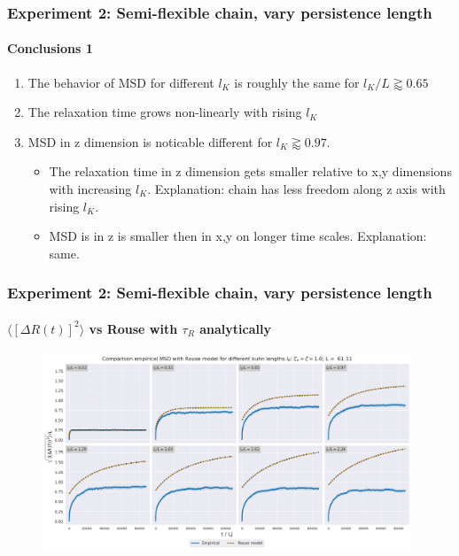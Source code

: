 \documentclass[handout]{beamer}
\newcommand{\mean}[1]{\langle #1 \rangle}
\begin{document}
\begin{frame}
    \frametitle{Experiment 2: Semi-flexible chain, vary persistence length}
    \framesubtitle{Conclusions 1}

    \begin{enumerate}
        \item The behavior of MSD for different $l_K$ is roughly the same for $l_K/L \gtrapprox 0.65$
        \item The relaxation time grows non-linearly with rising $l_K$
        \item MSD in z dimension is noticable different for $l_K \gtrapprox 0.97$. 
        \begin{itemize}
            \item The relaxation time in z dimension gets smaller 
            relative to x,y dimensions with increasing $l_K$. Explanation: chain has less freedom along z axis with rising $l_K$. 
            \item MSD is in z is smaller then in x,y on longer time scales. Explanation: same.
        \end{itemize}
    \end{enumerate}
\end{frame}

\begin{frame}
    \frametitle{Experiment 2: Semi-flexible chain, vary persistence length}
    \framesubtitle{$\mean{[\Delta R(t)]^2}$ vs Rouse with $\tau_R$ analytically}

    \begin{figure}[h]
        \includegraphics[width=11cm]{./4-exp-delta_R-rouse_anal.png}
    \end{figure}
\end{frame}
\end{document}
